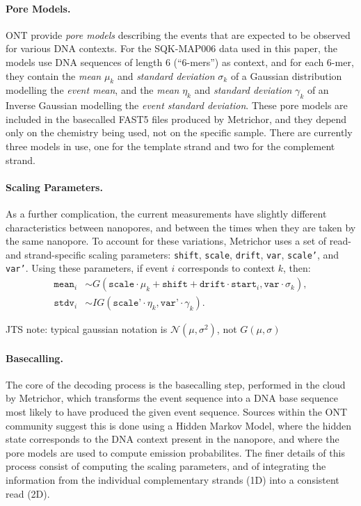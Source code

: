 \documentclass{bioinfo}
\begin{document}
\paragraph{Pore Models.}

ONT provide \emph{pore models} describing the events that are expected to be observed for various DNA contexts. For the SQK-MAP006 data used in this paper, the models use DNA sequences of length 6 (``6-mers'') as context, and for each 6-mer, they contain the \emph{mean} $\mu_k$ and \emph{standard deviation} $\sigma_k$ of a Gaussian distribution modelling the \emph{event mean}, and the \emph{mean} $\eta_k$ and \emph{standard deviation} $\gamma_k$ of an Inverse Gaussian modelling the \emph{event standard deviation}. These pore models are included in the basecalled FAST5 files produced by Metrichor, and they depend only on the chemistry being used, not on the specific sample. There are currently three models in use, one for the template strand and two for the complement strand.

\paragraph{Scaling Parameters.}
As a further complication, the current measurements have slightly different characteristics between nanopores, and between the times when they are taken by the same nanopore. To account for these variations, Metrichor uses a set of read- and strand-specific scaling parameters: \texttt{shift}, \texttt{scale}, \texttt{drift}, \texttt{var}, \texttt{scale'}, and \texttt{var'}. Using these parameters, if event $i$ corresponds to context $k$, then:
\begin{align*}
\texttt{mean}_i & \sim
G(\texttt{scale} \cdot \mu_k + \texttt{shift} + \texttt{drift} \cdot \texttt{start}_i,
\texttt{var} \cdot \sigma_k), \\
\texttt{stdv}_i & \sim
IG(\texttt{scale'} \cdot \eta_k,
\texttt{var'} \cdot \gamma_k).
\end{align*}

JTS note: typical gaussian notation is $\mathcal{N}(\mu, \sigma^2)$, not $G(\mu, \sigma)$

\paragraph{Basecalling.}
The core of the decoding process is the basecalling step, performed in the cloud by Metrichor, which transforms the event sequence into a DNA base sequence most likely to have produced the given event sequence. Sources within the ONT community suggest this is done using a Hidden Markov Model, where the hidden state corresponds to the DNA context present in the nanopore, and where the pore models are used to compute emission probabilites. The finer details of this process consist of computing the scaling parameters, and of integrating the information from the individual complementary strands (1D) into a consistent read (2D).
\end{document}
